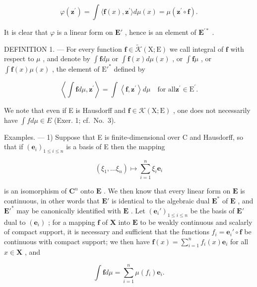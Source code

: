\[
\varphi (\mathbf {z} ^ {\prime}) = \int \langle \mathbf {f} (x), \mathbf {z} ^ {\prime} \rangle d \mu (x) = \mu (\mathbf {z} ^ {\prime} \circ \mathbf {f}).
\]

It is clear that \(\varphi\) is a linear form on \(\mathbf{E}'\) , hence is an element of \(\mathbf{E}^{\prime*}\) .

DEFINITION 1. --- For every function \(\mathbf{f} \in \widetilde{\mathcal{K}}(\mathrm{X};\mathrm{E})\) we call integral of \(\mathbf{f}\) with respect to \(\mu\) , and denote by \(\int \mathbf{f} d\mu\) or \(\int \mathbf{f}(x) d\mu(x)\) , or \(\int \mathbf{f}\mu\) , or \(\int \mathbf{f}(x)\mu(x)\) , the element of \(\mathrm{E}'^*\) defined by

\[
\left\langle \int \mathbf {f} d \mu , \mathbf {z} ^ {\prime} \right\rangle = \int \left\langle \mathbf {f}, \mathbf {z} ^ {\prime} \right\rangle d \mu \quad \text {for all} \mathbf {z} ^ {\prime} \in \mathrm{E} ^ {\prime}.\tag{1}
\]

We note that even if E is Hausdorff and \(\mathbf{f} \in \mathcal{K}(\mathrm{X};\mathrm{E})\) , one does not necessarily have \(\int f d\mu \in E\) (Exer. 1; cf.~No.~3).

Examples. --- 1) Suppose that E is finite-dimensional over C and Hausdorff, so that if \((\mathbf{e}_{i})_{1\leqslant i\leqslant n}\) is a basis of E then the mapping

\[
\left(\xi_ {1}, \dots \xi_ {n}\right) \mapsto \sum_ {i = 1} ^ {n} \xi_ {i} \mathbf {e} _ {i}
\]

is an isomorphism of \(\mathbf{C}^n\) onto \(\mathbf{E}\) . We then know that every linear form on \(\mathbf{E}\) is continuous, in other words that \(\mathbf{E}'\) is identical to the algebraic dual \(\mathbf{E}^*\) of \(\mathbf{E}\) , and \(\mathbf{E}'^*\) may be canonically identified with \(\mathbf{E}\) . Let \((\mathbf{e}_i')_{1 \leqslant i \leqslant n}\) be the basis of \(\mathbf{E}'\) dual to \((\mathbf{e}_i)\) ; for a mapping \(\mathbf{f}\) of \(\mathbf{X}\) into \(\mathbf{E}\) to be weakly continuous and scalarly of compact support, it is necessary and sufficient that the functions \(f_i = \mathbf{e}_i' \circ \mathbf{f}\) be continuous with compact support; we then have \(\mathbf{f}(x) = \sum_{i=1}^{n} f_i(x) \mathbf{e}_i\) for all \(x \in \mathbf{X}\) , and

\[
\int \mathbf {f} d \mu = \sum_ {i = 1} ^ {n} \mu (f _ {i}) \mathbf {e} _ {i}.
\]

